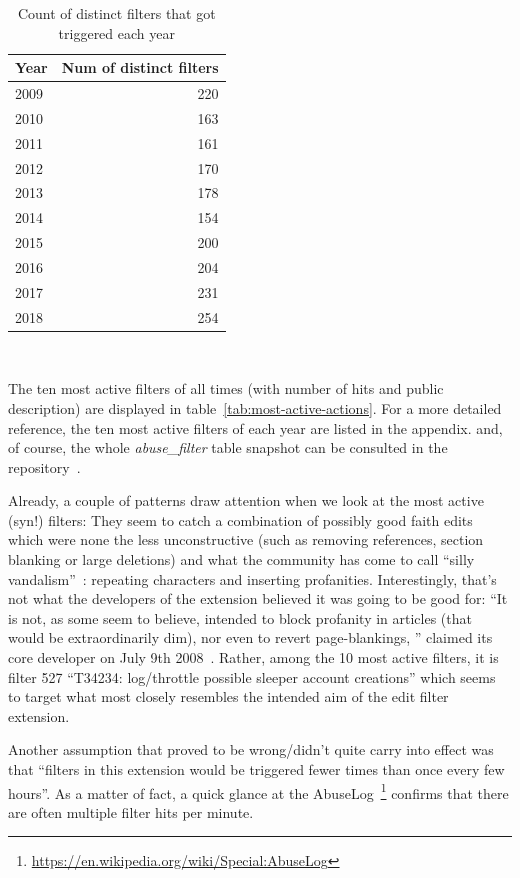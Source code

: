 \begin{table}
  \centering
  \begin{tabular}{l r }
    Year & Num of distinct filters \\
    \hline
    2009 & 220 \\
    2010 & 163 \\
    2011 & 161 \\
    2012 & 170 \\
    2013 & 178 \\
    2014 & 154 \\
    2015 & 200 \\
    2016 & 204 \\
    2017 & 231 \\
    2018 & 254 \\
  \end{tabular}
  \caption{Count of distinct filters that got triggered each year}~\label{tab:active-filters-count}
\end{table}

The ten most active filters of all times (with number of hits and public description) are displayed in table~\ref{tab:most-active-actions}.
For a more detailed reference, the ten most active filters of each year are listed in the appendix. %
and, of course, the whole \emph{abuse\_filter} table snapshot can be consulted in the repository~\cite{github}.

Already, a couple of patterns draw attention when we look at the most active (syn!) filters:
They seem to catch a combination of possibly good faith edits which were none the less unconstructive (such as removing references, section blanking or large deletions)
and what the community has come to call ``silly vandalism''~\cite{Wikipedia:VandalismTypes}: repeating characters and inserting profanities.
Interestingly, that's not what the developers of the extension believed it was going to be good for:
``It is not, as some seem to believe, intended to block profanity in articles (that would be extraordinarily dim), nor even to revert page-blankings, '' claimed its core developer on July 9th 2008~\cite{Wikipedia:EditFilterTalkArchive1}.
Rather, among the 10 most active filters, it is filter 527 ``T34234: log/throttle possible sleeper account creations'' which seems to target what most closely resembles the intended aim of the edit filter extension. %

Another assumption that proved to be wrong/didn't quite carry into effect was that ``filters in this extension would be triggered fewer times than once every few hours''.
As a matter of fact, a quick glance at the AbuseLog~\footnote{\url{https://en.wikipedia.org/wiki/Special:AbuseLog}} confirms that there are often multiple filter hits per minute.

